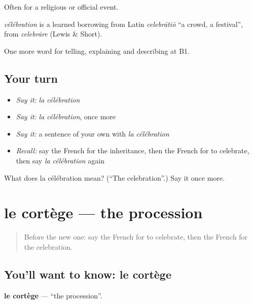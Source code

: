 Often for a religious or official event.

\begin{cousinweb}
\emph{célébration} is a learned borrowing from Latin \emph{celebrātiō} \textquotedblleft{}a crowd, a festival\textquotedblright{}, from \emph{celebrāre} (Lewis \& Short).
\end{cousinweb}

\begin{grammarlens}[title={What you've built}]
One more word for telling, explaining and describing at B1.
\end{grammarlens}

\subsection*{Your turn}
\begin{itemize}
\raggedright
  \item \emph{Say it:} \emph{la célébration}
  \item \emph{Say it:} \emph{la célébration}, once more
  \item \emph{Say it:} a sentence of your own with \emph{la célébration}
  \item \emph{Recall:} say the French for the inheritance, then the French for to celebrate, then say \emph{la célébration} again
\end{itemize}

\begin{tcolorbox}[breakable,colback=teal!4,colframe=teal!35!black,title={Before you move on}]
What does la célébration mean? (\textquotedblleft{}The celebration\textquotedblright{}.) Say it once more.
\end{tcolorbox}
\section[le cortège]{le cortège — the procession}

\label{lesson:FR-C316-cortege}



\begin{quote}
Before the new one: say the French for to celebrate, then the French for the celebration.
\end{quote}

\subsection*{You'll want to know: le cortège}
\textbf{le cortège} — \textquotedblleft{}the procession\textquotedblright{}.

